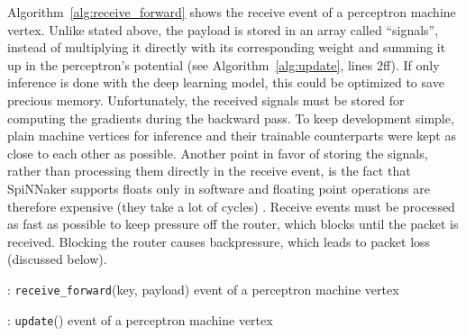 \documentclass[]{article}
\begin{document}
Algorithm~\ref{alg:receive_forward} shows the receive event of a
perceptron machine vertex.
Unlike stated above, the payload is stored in an array called
``signals'',
instead of multiplying it directly with its corresponding weight and
summing it up in the perceptron's potential
(see Algorithm~\ref{alg:update}, lines 2ff).
If only inference is done with the deep learning model, this could
be optimized to save precious memory.
Unfortunately, the received signals must be stored for computing the
gradients during the backward pass.
To keep development simple, plain machine vertices for inference and
their trainable counterparts were kept as close to each other as
possible.
Another point in favor of storing the signals, rather than processing
them directly in the receive event, is the fact that SpiNNaker
supports floats only in software and floating point operations are
therefore expensive (they take a lot of cycles)
\citep{furber_et_al_2020}.
Receive events must be processed as fast as possible to keep pressure
off the router, which blocks until the packet is received.
Blocking the router causes backpressure, which leads to packet loss
(discussed below).

\begin{algorithm} %
  \caption{: \texttt{receive\_forward}(key, payload) event of a
    perceptron machine vertex}
  \label{alg:receive_forward}

  \begin{algorithmic}[1]
  \end{algorithmic}
\end{algorithm} %

\begin{algorithm} %
  \caption{: \texttt{update}() event of a perceptron machine vertex}
  \label{alg:update}

  \begin{algorithmic}[1]
      \ENDFOR
    \ENDIF
  \end{algorithmic}
\end{algorithm} %
\end{document}
